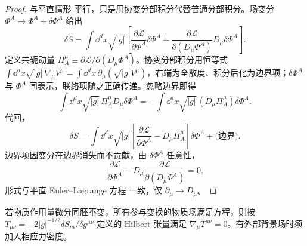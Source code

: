 \begin{proof}
与平直情形 平行，只是用协变分部积分代替普通分部积分。场变分 $\Phi^A\to\Phi^A+\delta\Phi^A$ 给出
\begin{equation*}
\delta S=\int \dd^dx\sqrt{|g|}\left[\frac{\partial\mathcal{L}}{\partial\Phi^A}\delta\Phi^A+\frac{\partial\mathcal{L}}{\partial(D_\mu\Phi^A)}D_\mu\delta\Phi^A\right].
\end{equation*}
定义共轭动量 $\Pi_A^\mu\equiv\partial\mathcal{L}/\partial(D_\mu\Phi^A)$。协变分部积分用恒等式 $\int\dd^dx\sqrt{|g|}\,\nabla_\mu V^\mu=\int\dd^dx\,\partial_\mu(\sqrt{|g|}V^\mu)$，右端为全散度、积分后化为边界项；$\delta\Phi^A$ 与 $\Phi^A$ 同表示，联络项随之正确传递。忽略边界即得
\begin{equation*}
\int\dd^dx\sqrt{|g|}\,\Pi_A^\mu D_\mu\delta\Phi^A
=-\int\dd^dx\sqrt{|g|}\,(D_\mu\Pi_A^\mu)\delta\Phi^A.
\end{equation*}
代回，
\begin{equation*}
\delta S=\int\dd^dx\sqrt{|g|}\left[\frac{\partial\mathcal{L}}{\partial\Phi^A}-D_\mu\Pi_A^\mu\right]\delta\Phi^A+\text{(边界)}.
\end{equation*}
边界项因变分在边界消失而不贡献，由 $\delta\Phi^A$ 任意性，
\begin{equation}\label{eq:ms-curved-EL}
{
\frac{\partial\mathcal{L}}{\partial\Phi^A}-D_\mu\frac{\partial\mathcal{L}}{\partial(D_\mu\Phi^A)}=0.
}
\end{equation}
形式与平直 Euler--Lagrange 方程 一致，仅 $\partial_\mu\to D_\mu$。
\end{proof}

\begin{proposition}[微分同胚不变性与协变守恒]
若物质作用量微分同胚不变，所有参与变换的物质场满足方程，则按 $T_{\mu\nu}=-2|g|^{-1/2}\delta S_m/\delta g^{\mu\nu}$ 定义的 Hilbert 张量满足 $\nabla_\mu T^{\mu\nu}=0$。有外部背景场时须加入相应力密度。
\end{proposition}

